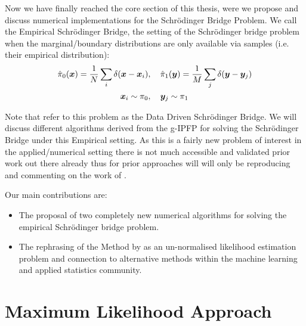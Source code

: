 \documentclass[a4paper,12pt,twoside,openright]{report}
\theoremstyle{definition}
\begin{document}
Now we have finally reached the core section of this thesis, were we propose and discuss numerical implementations for the Schrödinger Bridge Problem. We call the Empirical Schrödinger Bridge, the setting of the Schrödinger bridge problem when the marginal/boundary distributions are only available via samples (i.e. their empirical distribution):
\begin{align}
    \hat{\pi}_0({\bm{x}})  = \frac{1}{N}\sum_i \delta({\bm{x}} -{\bm{x}}_i) &, \quad\hat{\pi}_1({\bm{y}})  = \frac{1}{M}\sum_j \delta({\bm{y}} -{\bm{y}}_j) \nonumber\\
    {\bm{x}}_i \sim \pi_0 &, \quad {\bm{y}}_j \sim \pi_1
\end{align}

Note that \cite{pavon2018data} refer to this problem as the Data Driven Schrödinger Bridge. We will discuss  different algorithms derived from the g-IPFP for solving the Schrödinger Bridge under this Empirical setting. As this is a fairly new problem of interest in the applied/numerical setting there is not much accessible and validated prior work out there already thus for prior approaches will will only be reproducing and commenting on the work of \cite{pavon2018data}.

Our main contributions are:

\begin{itemize}
    \item The proposal of two completely new numerical algorithms for solving the empirical Schrödinger bridge problem.
    \item The rephrasing of the Method by \cite{pavon2018data} as an un-normalised likelihood estimation problem and connection to alternative methods within the machine learning and applied statistics community.
\end{itemize}



\section{Maximum Likelihood Approach \citep{pavon2018data}}
\end{document}
